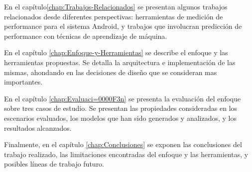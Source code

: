 En el capítulo\ref{chap:Trabajos-Relacionados} se presentan algunos
trabajos relacionados desde diferentes perspectivas: herramientas
de medición de performance para el sistema Android, y trabajos que
involucran predicción de performance con técnicas de aprendizaje de
máquina.

En el capítulo \ref{chap:Enfoque-y-Herramientas} se describe el enfoque
y las herramientas propuestas. Se detalla la arquitectura e implementación
de las mismas, ahondando en las decisiones de diseño que se consideran
mas importantes. 

En el capítulo \ref{chap:Evaluaci=0000F3n} se presenta la evaluación
del enfoque sobre tres casos de estudio. Se presentan las propiedades
consideradas en los escenarios evaluados, los modelos que han sido
generados y analizados, y los resultados alcanzados.

Finalmente, en el capítulo \ref{chap:Conclusiones} se exponen las
conclusiones del trabajo realizado, las limitaciones encontradas del
enfoque y las herramientas, y posibles líneas de trabajo futuro.
